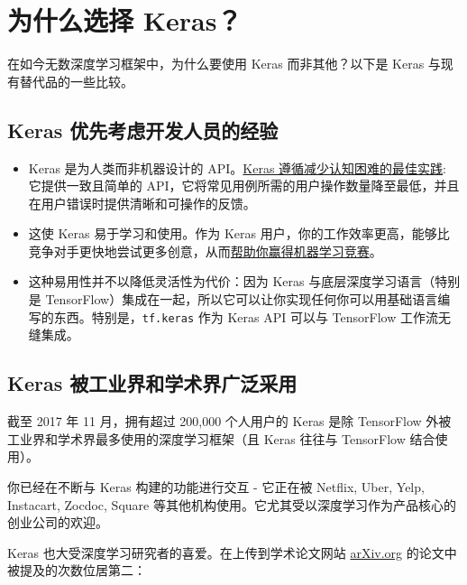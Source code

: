 \section{为什么选择 Keras？}\label{ux4e3aux4ec0ux4e48ux9009ux62e9-keras}

在如今无数深度学习框架中，为什么要使用 Keras 而非其他？以下是 Keras
与现有替代品的一些比较。


\subsection{Keras
优先考虑开发人员的经验}\label{keras-ux4f18ux5148ux8003ux8651ux5f00ux53d1ux4ebaux5458ux7684ux7ecfux9a8c}

\begin{itemize}
\item
  Keras 是为人类而非机器设计的
  API。\href{https://blog.keras.io/user-experience-design-for-apis.html}{Keras
  遵循减少认知困难的最佳实践}: 它提供一致且简单的
  API，它将常见用例所需的用户操作数量降至最低，并且在用户错误时提供清晰和可操作的反馈。
\item
  这使 Keras 易于学习和使用。作为 Keras
  用户，你的工作效率更高，能够比竞争对手更快地尝试更多创意，从而\href{https://www.quora.com/Why-has-Keras-been-so-successful-lately-at-Kaggle-competitions}{帮助你赢得机器学习竞赛}。
\item
  这种易用性并不以降低灵活性为代价：因为 Keras
  与底层深度学习语言（特别是
  TensorFlow）集成在一起，所以它可以让你实现任何你可以用基础语言编写的东西。特别是，\texttt{tf.keras}
  作为 Keras API 可以与 TensorFlow 工作流无缝集成。
\end{itemize}


\subsection{Keras
被工业界和学术界广泛采用}\label{keras-ux88abux5de5ux4e1aux754cux548cux5b66ux672fux754cux5e7fux6cdbux91c7ux7528}

截至 2017 年 11 月，拥有超过 200,000 个人用户的 Keras 是除 TensorFlow
外被工业界和学术界最多使用的深度学习框架（且 Keras 往往与 TensorFlow
结合使用）。

你已经在不断与 Keras 构建的功能进行交互 - 它正在被 Netflix, Uber, Yelp,
Instacart, Zocdoc, Square
等其他机构使用。它尤其受以深度学习作为产品核心的创业公司的欢迎。

Keras 也大受深度学习研究者的喜爱。在上传到学术论文网站
\href{https://arxiv.org/archive/cs}{arXiv.org}
的论文中被提及的次数位居第二：

